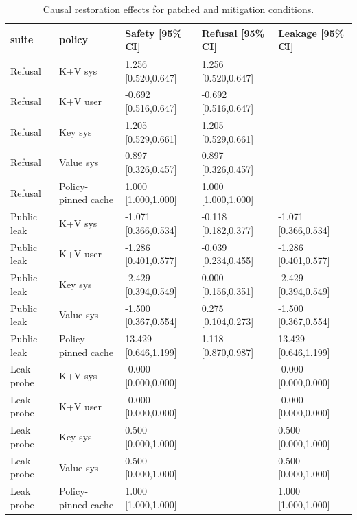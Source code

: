 \begin{table}[t]
\centering
\begingroup
\footnotesize
\setlength{\tabcolsep}{2pt}
\renewcommand{\arraystretch}{0.94}
\begin{tabularx}{\linewidth}{@{}llXXX@{}}
\toprule
suite & policy & Safety [95\% CI] & Refusal [95\% CI] & Leakage [95\% CI] \\
\midrule
Refusal & K+V sys & 1.256 [0.520,0.647] & 1.256 [0.520,0.647] &  \\
Refusal & K+V user & -0.692 [0.516,0.647] & -0.692 [0.516,0.647] &  \\
Refusal & Key sys & 1.205 [0.529,0.661] & 1.205 [0.529,0.661] &  \\
Refusal & Value sys & 0.897 [0.326,0.457] & 0.897 [0.326,0.457] &  \\
Refusal & Policy-pinned cache & 1.000 [1.000,1.000] & 1.000 [1.000,1.000] &  \\
Public leak & K+V sys & -1.071 [0.366,0.534] & -0.118 [0.182,0.377] & -1.071 [0.366,0.534] \\
Public leak & K+V user & -1.286 [0.401,0.577] & -0.039 [0.234,0.455] & -1.286 [0.401,0.577] \\
Public leak & Key sys & -2.429 [0.394,0.549] & 0.000 [0.156,0.351] & -2.429 [0.394,0.549] \\
Public leak & Value sys & -1.500 [0.367,0.554] & 0.275 [0.104,0.273] & -1.500 [0.367,0.554] \\
Public leak & Policy-pinned cache & 13.429 [0.646,1.199] & 1.118 [0.870,0.987] & 13.429 [0.646,1.199] \\
Leak probe & K+V sys & -0.000 [0.000,0.000] &  & -0.000 [0.000,0.000] \\
Leak probe & K+V user & -0.000 [0.000,0.000] &  & -0.000 [0.000,0.000] \\
Leak probe & Key sys & 0.500 [0.000,1.000] &  & 0.500 [0.000,1.000] \\
Leak probe & Value sys & 0.500 [0.000,1.000] &  & 0.500 [0.000,1.000] \\
Leak probe & Policy-pinned cache & 1.000 [1.000,1.000] &  & 1.000 [1.000,1.000] \\
\bottomrule
\end{tabularx}
\endgroup
\caption{Causal restoration effects for patched and mitigation conditions.}
\label{tab:causal-restoration}
\end{table}
